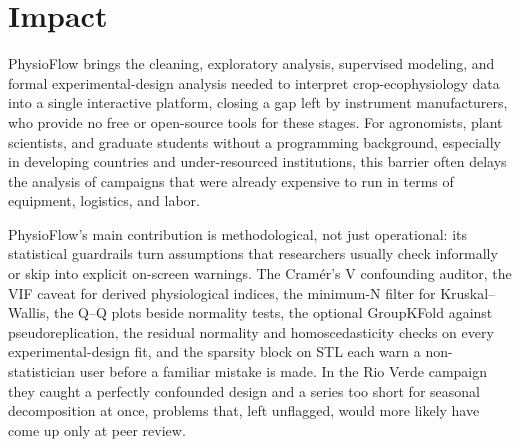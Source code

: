\documentclass[preprint,12pt,a4paper]{elsarticle}
\begin{document}
\section{Impact}\label{sec:impact}

PhysioFlow brings the cleaning, exploratory analysis, supervised modeling, and formal experimental-design analysis needed to interpret crop-ecophysiology data into a single interactive platform, closing a gap left by instrument manufacturers, who provide no free or open-source tools for these stages. For agronomists, plant scientists, and graduate students without a programming background, especially in developing countries and under-resourced institutions, this barrier often delays the analysis of campaigns that were already expensive to run in terms of equipment, logistics, and labor.

PhysioFlow's main contribution is methodological, not just operational: its statistical guardrails turn assumptions that researchers usually check informally or skip into explicit on-screen warnings. The Cram\'er's V confounding auditor, the VIF caveat for derived physiological indices, the minimum-N filter for Kruskal--Wallis, the Q--Q plots beside normality tests, the optional GroupKFold against pseudoreplication, the residual normality and homoscedasticity checks on every experimental-design fit, and the sparsity block on STL each warn a non-statistician user before a familiar mistake is made. In the Rio Verde campaign they caught a perfectly confounded design and a series too short for seasonal decomposition at once, problems that, left unflagged, would more likely have come up only at peer review.
\end{document}
